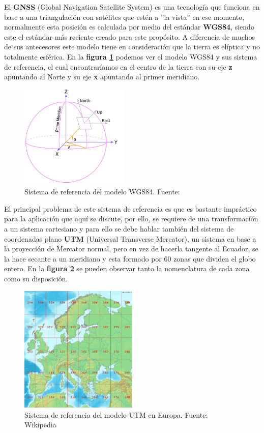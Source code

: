 El \textbf{GNSS} (Global Navigation Satellite System) es una tecnología que funciona en base a una triangulación con satélites que 
estén a ''la vista'' en ese momento, normalmente esta 
posición es calculada por medio del estándar \textbf{WGS84}, siendo este el estándar más reciente creado para este propósito. A 
diferencia de muchos de sus antecesores este modelo tiene en consideración 
que la tierra es elíptica y no totalmente esférica. En la \textbf{figura \ref{fig:wgs84}} podemos ver el modelo WGS84 y sus sistema 
de referencia, el cual encontraríamos en el centro de la tierra 
con su eje \textbf{z} apuntando al Norte y su eje \textbf{x} apuntando al primer meridiano.

\begin{figure}[h]
    \centering
    \includegraphics[width=0.46\textwidth]{images/wgs84.png}
    \caption{Sistema de referencia del modelo WGS84. Fuente: \cite{nav2}}
    \label{fig:wgs84}
\end{figure}

El principal problema de este sistema de referencia es que es bastante impráctico para la aplicación que aquí se discute, por ello,  
se requiere de una transformación a un sistema cartesiano y para ello se debe hablar también del sistema de coordenadas plano \textbf{UTM} 
(Universal Transverse Mercator), un sistema en base a la proyección de Mercator normal, pero en vez de hacerla tangente al Ecuador, 
se la hace secante a un meridiano y esta formado por 60 zonas que dividen el globo entero. En la \textbf{figura \ref{fig:utm_europa}} se 
pueden observar tanto la nomenclatura de cada zona como su disposición.

\begin{figure}[h]
    \centering
    \includegraphics[width=0.5\textwidth]{images/europe_utm.png}
    \caption{Sistema de referencia del modelo UTM en Europa. Fuente: Wikipedia}
    \label{fig:utm_europa}
\end{figure}


